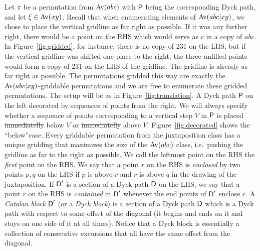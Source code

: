 \documentclass[12pt, a4paper, twoside]{report}
\providecommand{\DIFaddtex}[1]{{\protect\color{blue}\uwave{#1}}} %
\providecommand{\DIFdeltex}[1]{{\protect\color{red}\sout{#1}}}                      %
\providecommand{\DIFaddbegin}{} %
\providecommand{\DIFaddend}{} %
\providecommand{\DIFdelbegin}{} %
\providecommand{\DIFdelend}{} %
\providecommand{\DIFadd}[1]{\texorpdfstring{\DIFaddtex{#1}}{#1}} %
\providecommand{\DIFdel}[1]{\texorpdfstring{\DIFdeltex{#1}}{}} %
\begin{document}
Let $\pi$ be a permutation from $\mathrm{Av}(abc)$ with $\textsf{P}$ being the corresponding Dyck path, and let $\xi \in \mathrm{Av}(xy)$. Recall that when enumerating elements of $\mathrm{Av}(abc|xy)$, we chose to place the vertical gridline as far right as possible.  If it was any further right, there would be a point on the RHS which would serve as $c$ in a copy of $abc$. In Figure~\ref{fig:gridded}, for instance, there is no copy of 231 on the LHS, but if the vertical gridline was shifted one place to the right, the three unfilled points would form a copy of 231 on the LHS of the gridline. The gridline is already as far right as possible. The permutations gridded this way are exactly the $\mathrm{Av}(abc|xy)$-griddable permutations and we are free to enumerate these gridded permutations. The setup will be as in Figure~\ref{fig:translation}. A Dyck path $\textsf{P}$ on the left decorated by sequences of points from the right. We will always specify whether a sequence of points corresponding to a vertical step $V$ in $\textsf{P}$ is placed \DIFdelbegin \DIFdel{immediatelly }\DIFdelend \DIFaddbegin \DIFadd{immediately }\DIFaddend below $V$ or \DIFdelbegin \DIFdel{immediatelly }\DIFdelend \DIFaddbegin \DIFadd{immediately }\DIFaddend above $V$. Figure~\ref{fig:decorated} shows the ``below''case. Every griddable permutation from the juxtaposition class has a unique gridding that maximizes the size of the $\mathrm{Av}(abc)$ class, i.e.~pushing the gridline as far to the right as possible. We call the leftmost point on the RHS the \emph{first} point on the RHS. We say that a point $r$ on the RHS is \emph{enclosed} by two points $p,q$ on the LHS if $p$ is above $r$ and $r$ is above $q$ in the drawing of the juxtaposition. If $\textsf{D}'$ is a section of a Dyck path $\textsf{D}$ on the LHS, we say that a point $r$ on the RHS is \emph{contained} in $\textsf{D}'$ whenever the end points of $\textsf{D}'$ enclose $r$. A \emph{Catalan block} $\textsf{D}'$ (or a \emph{Dyck block}) is a section of a Dyck path $\textsf{D}$ which is a Dyck path with respect to some offset of the diagonal (it begins and ends on it and stays on one side of it at all times). Notice that a Dyck block is essentially a collection of consecutive excursions that all have the same offset from the diagonal.
\end{document}
